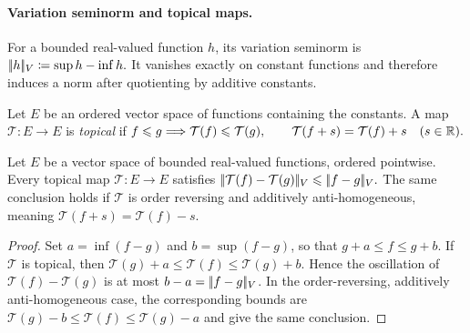\paragraph{Variation seminorm and topical maps.}
\begin{defn}\label{def-variation-seminorm}
For a bounded real-valued function $h$, its variation seminorm is \(|\!| h |\!|_V\coloneqq \sup h-\inf h.\)
It vanishes exactly on constant functions and therefore induces a norm after quotienting by additive constants.
\end{defn}
\begin{defn}\label{def-topical-map}
Let $E$ be an ordered vector space of functions containing the constants. A map $\mathcal T:E\to E$ is \emph{topical} if
\(f\leqslant g\Longrightarrow\mathcal T(f)\leqslant\mathcal T(g), \qquad \mathcal T(f+s)=\mathcal T(f)+s \quad(s\in\mathbb{R}).\)
\end{defn}
\begin{prop}\label{prop-topical-variation-nonexpansive}
Let $E$ be a vector space of bounded real-valued functions, ordered pointwise. Every topical map $\mathcal T:E\to E$ satisfies \(|\!| \mathcal T(f)-\mathcal T(g) |\!|_V \leqslant |\!| f-g |\!|_V.\)
The same conclusion holds if $\mathcal T$ is order reversing and additively anti-homogeneous, meaning $\mathcal T(f+s)=\mathcal T(f)-s$.
\end{prop}
\begin{proof}
Set $a=\inf(f-g)$ and $b=\sup(f-g)$, so that $g+a\leq f\leq g+b$. If $\mathcal T$ is topical, then
\(\mathcal T(g)+a\leq\mathcal T(f)\leq\mathcal T(g)+b.\)
Hence the oscillation of $\mathcal T(f)-\mathcal T(g)$ is at most $b-a=|\!| f-g |\!|_V$. In the order-reversing, additively anti-homogeneous case, the corresponding bounds are $\mathcal T(g)-b\leq\mathcal T(f)\leq\mathcal T(g)-a$ and give the same conclusion.
\end{proof}
